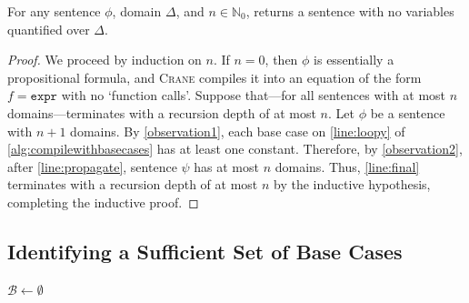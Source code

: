 \documentclass[a4paper,UKenglish,cleveref, autoref, thm-restate]{lipics-v2021}
\newcommand{\expr}{\mathtt{expr}}
\begin{document}
\begin{observation}\label{observation2}
  For any sentence $\phi$, domain $\Delta$, and $n \in \mathbb{N}_{0}$,
   returns a sentence with no variables
  quantified over $\Delta$.
\end{observation}

\begin{proof}
  We proceed by induction on $n$. If $n=0$, then $\phi$ is essentially a
  propositional formula, and \textsc{Crane} compiles it into an equation of the
  form $f = \expr$ with no `function calls'. Suppose that---for all sentences
  with at most $n$ domains---\CompileWithBaseCases terminates with a recursion
  depth of at most $n$. Let $\phi$ be a sentence with $n+1$ domains. By
  \cref{observation1}, each base case on \autoref{line:loopy} of
  \cref{alg:compilewithbasecases} has at least one constant. Therefore, by
  \cref{observation2}, after \autoref{line:propagate}, sentence $\psi$ has at
  most $n$ domains. Thus, \autoref{line:final} terminates with a recursion depth
  of at most $n$ by the inductive hypothesis, completing the inductive proof.
\end{proof}

\subsection{Identifying a Sufficient Set of Base Cases}\label{sec:identifying}

\begin{algorithm}[t]
  \caption{\protect{}}\label{alg:findbasecases}

  $\mathcal{B} \gets \emptyset$\;
\end{algorithm}
\end{document}
